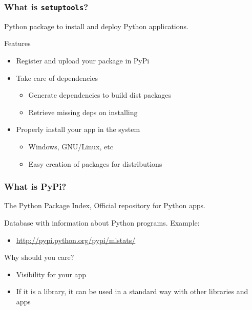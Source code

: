 \documentclass[11pt]{beamer}
\begin{document}
   
\begin{frame}[fragile]\frametitle{What is \texttt{setuptools}?}
\label{sec-1_1}


Python package to install and deploy Python applications. 


Features

\begin{itemize}
\item Register and upload your package in PyPi
\item Take care of dependencies

\begin{itemize}
\item Generate dependencies to build dist packages
\item Retrieve missing deps on installing
\end{itemize}

\item Properly install your app in the system

\begin{itemize}
\item Windows, GNU/Linux, etc
\item Easy creation of packages for distributions
\end{itemize}

\end{itemize}
\end{frame}
\begin{frame}[fragile]\frametitle{What is PyPi?}
\label{sec-1_2}


The Python Package Index, Official repository for Python apps.


Database with information about Python programs. Example:


\begin{itemize}
\item \href{http://pypi.python.org/pypi/mlstats/}{http://pypi.python.org/pypi/mlstats/}
\end{itemize}

Why should you care?

\begin{itemize}
\item Visibility for your app
\item If it is a library, it can be used in a standard way with other
  libraries and apps
\end{itemize}
\end{frame}
\end{document}
